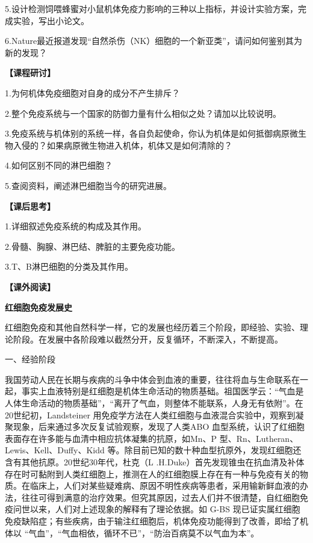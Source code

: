 5.设计检测饲喂蜂蜜对小鼠机体免疫力影响的三种以上指标，并设计实验方案，完成实验，写出小论文。

6.Nature最近报道发现“自然杀伤（NK）细胞的一个新亚类”，请问如何鉴别其为新的发现？

\noindent\textbf{【课程研讨】}

1.为何机体免疫细胞对自身的成分不产生排斥？

2.整个免疫系统与一个国家的防御力量有什么相似之处？请加以比较说明。

3.免疫系统与机体别的系统一样，各自负起使命，你认为机体是如何抵御病原微生物入侵的？如果病原微生物进入机体，机体又是如何清除的？

4.如何区别不同的淋巴细胞？

5.查阅资料，阐述淋巴细胞当今的研究进展。

\noindent\textbf{【课后思考】}

1.详细叙述免疫系统的构成及其作用。

2.骨髓、胸腺、淋巴结、脾脏的主要免疫功能。

3.T、B淋巴细胞的分类及其作用。

\noindent\textbf{【课外阅读】}

\begin{center}
\textbf{\Large 红细胞免疫发展史}
\end{center}

红细胞免疫和其他自然科学一样，它的发展也经历着三个阶段，即经验、实验、理论阶段。在发展中各阶段难以截然分开，反复循环，不断深入，不断提高。

\begin{center}
{\large 一、经验阶段}
\end{center}

我国劳动人民在长期与疾病的斗争中体会到血液的重要，往往将血与生命联系在一起，事实上血液特别是红细胞是机体生命活动的物质基础。祖国医学云：“气血是人体生命活动的物质基础”，“离开了气血，则整体不能联系，人身无有依附”。在20世纪初，Landsteiner
用免疫学方法在人类红细胞与血液混合实验中，观察到凝聚现象，后来通过多次反复试验观察，发现了人类ABO
血型系统，认识了红细胞表面存在许多能与血清中相应抗体凝集的抗原，如Mn、P
型、Rn、Lutheran、Lewis、Kell、Duffy、Kidd
等。除目前已知的数十种血型抗原外，发现红细胞还含有其他抗原。20世纪30年代，杜克（L
.H.Duke）首先发现锥虫在抗血清及补体存在时可黏附到人类红细胞上，推测在人的红细胞膜上存在有一种与免疫有关的物质。在临床上，人们对某些疑难病、原因不明性疾病等患者，采用输新鲜血液的办法，往往可得到满意的治疗效果。但究其原因，过去人们并不很清楚，自红细胞免疫问世以来，人们对上述现象的解释有了理论依据。如
G-BS
现已证实属红细胞免疫缺陷症；有些疾病，由于输注红细胞后，机体免疫功能得到了改善，即给了机体以
“气血”，“气血相依，循环不已”，“防治百病莫不以气血为本”。

